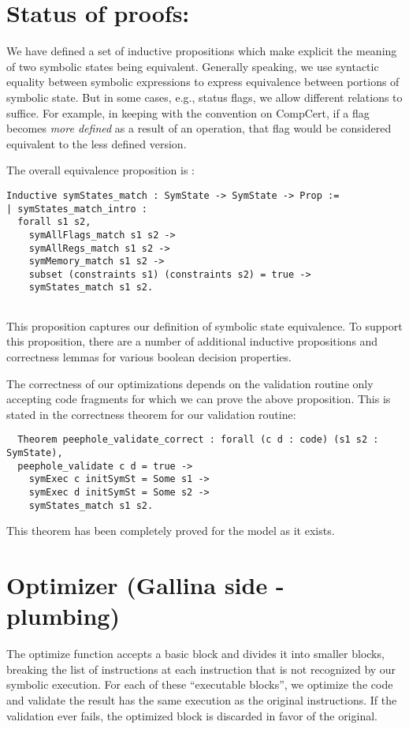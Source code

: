 \documentclass{article}
\begin{document}
\section{Status of proofs: }
We have defined a set of inductive propositions which make explicit
the meaning of two symbolic states being equivalent. Generally
speaking, we use syntactic equality between symbolic expressions to
express equivalence between portions of symbolic state. But
in some cases, e.g., status flags, we allow different relations to
suffice. For example, in keeping with the convention on CompCert, if a
flag becomes {\it more defined} as a result of an operation, that flag
would be considered equivalent to the less defined version. 

The overall equivalence proposition is :

\begin{verbatim}
Inductive symStates_match : SymState -> SymState -> Prop :=
| symStates_match_intro : 
  forall s1 s2, 
    symAllFlags_match s1 s2 ->
    symAllRegs_match s1 s2 ->
    symMemory_match s1 s2 ->
    subset (constraints s1) (constraints s2) = true ->
    symStates_match s1 s2. 
  
\end{verbatim}

This proposition captures our definition of symbolic state
equivalence. To support this proposition, there are a number of
additional inductive propositions and correctness lemmas for various
boolean decision properties. 

The correctness of our optimizations depends on the validation routine
only accepting code fragments for which we can prove the above
proposition. This is stated in  the correctness theorem for our
validation routine:

\begin{verbatim}
  Theorem peephole_validate_correct : forall (c d : code) (s1 s2 : SymState),
  peephole_validate c d = true -> 
    symExec c initSymSt = Some s1 -> 
    symExec d initSymSt = Some s2 ->
    symStates_match s1 s2.
\end{verbatim}

This theorem has been completely proved for the model as it
exists.

\section{Optimizer (Gallina side - plumbing)}
The optimize function accepts a basic block and divides it into
smaller blocks, breaking the list of instructions at each instruction
that is not recognized by our symbolic execution.  For each of these
``executable blocks'', we optimize the code and validate the result
has the same execution as the original instructions.  If the
validation ever fails, the optimized block is discarded in favor of
the original.
\end{document}
